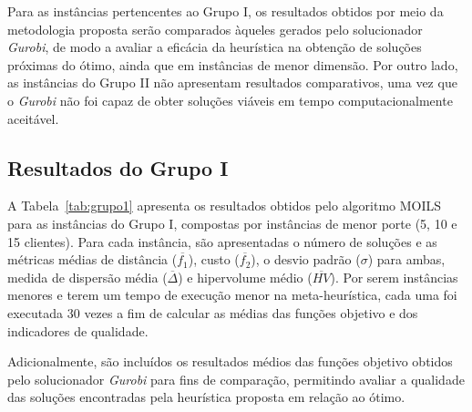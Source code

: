 Para as instâncias pertencentes ao Grupo I, os resultados obtidos por meio da metodologia proposta serão comparados àqueles gerados pelo solucionador \textit{Gurobi}, de modo a avaliar a eficácia da heurística na obtenção de soluções próximas do ótimo, ainda que em instâncias de menor dimensão. Por outro lado, as instâncias do Grupo II não apresentam resultados comparativos, uma vez que o \textit{Gurobi} não foi capaz de obter soluções viáveis em tempo computacionalmente aceitável.


\subsection{Resultados do Grupo I}\label{sec:g1}

A Tabela~\ref{tab:grupo1} apresenta os resultados obtidos pelo algoritmo MOILS para as instâncias do Grupo I, compostas por instâncias de menor porte (5, 10 e 15 clientes). Para cada instância, são apresentadas o número de soluções e as métricas médias de distância ($\overline{f_1}$), custo ($\overline{f_2}$), o desvio padrão ($\sigma$) para ambas, medida de dispersão média ($\overline{\Delta}$) e hipervolume médio ($\overline{HV}$). Por serem instâncias menores e terem um tempo de execução menor na meta-heurística, cada uma foi executada 30 vezes a fim de calcular as médias das funções objetivo e dos indicadores de qualidade.

Adicionalmente, são incluídos os resultados médios das funções objetivo obtidos pelo solucionador \textit{Gurobi} para fins de comparação, permitindo avaliar a qualidade das soluções encontradas pela heurística proposta em relação ao ótimo.



